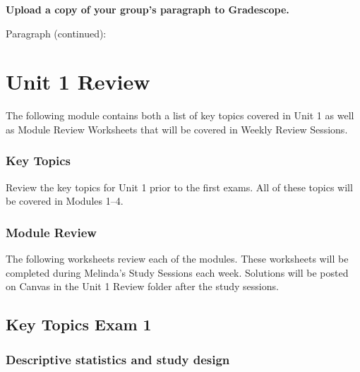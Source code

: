 \documentclass[
]{report}
\begin{document}
\textbf{Upload a copy of your group's paragraph to Gradescope.}

\newpage

Paragraph (continued):

\newpage

\chapter{Unit 1 Review}\label{unit-1-review}

The following module contains both a list of key topics covered in Unit 1 as well as Module Review Worksheets that will be covered in Weekly Review Sessions.

\subsection{Key Topics}\label{key-topics-4}

Review the key topics for Unit 1 prior to the first exams. All of these topics will be covered in Modules 1--4.

\subsection{Module Review}\label{module-review}


The following worksheets review each of the modules. These worksheets will be completed during Melinda's Study Sessions each week. Solutions will be posted on Canvas in the Unit 1 Review folder after the study sessions.

\newpage

\section{Key Topics Exam 1}\label{key-topics-exam-1}

\subsection*{Descriptive statistics and study design}\label{descriptive-statistics-and-study-design}
\end{document}

